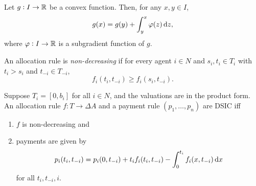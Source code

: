 		\begin{lemma}
			\label{lem: subgrad int}
			Let $g : I \to \mathbb{R}$ be a convex function. Then, for any $x,y \in I$,
			\[ g(x) = g(y) + \int_y^x \varphi(z) \dif z, \]
			where $\varphi:I \to \mathbb{R}$ is a subgradient function of $g$.
		\end{lemma}

		\begin{fdef}
			An allocation rule is \emph{non-decreasing} if for every agent $i \in N$ and $s_i,t_i \in T_i$ with $t_i > s_i$ and $t_{-i} \in T_{-i}$,
			\[ f_i(t_i,t_{-i}) \ge f_i(s_i,t_{-i}). \]
		\end{fdef}

		\begin{ftheo}[Myerson]
			\label{theo: myerson}
			Suppose $T_i = [0,b_i]$ for all $i \in N$, and the valuations are in the product form. An allocation rule $f : T \to \Delta A$ and a payment rule $(p_1,\ldots,p_n)$ are DSIC iff
			\begin{enumerate}[label=(\alph*)]
				\item $f$ is non-decreasing and
				\item payments are given by
				\[ p_i(t_i,t_{-i}) = p_i(0,t_{-i}) + t_i f_i(t_i,t_{-i}) - \int_0^{t_i} f_i(x,t_{-i}) \dif x \]
				for all $t_i,t_{-i},i$.
			\end{enumerate}
		\end{ftheo}
